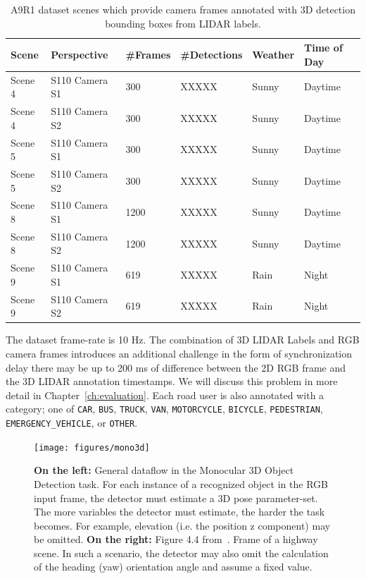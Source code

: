 \begin{table}[h]
    \centering
    \caption{A9R1 dataset scenes which provide camera frames annotated with 3D detection bounding boxes from LIDAR labels.}
    \label{tab:a9r1}
    \begin{tabular}{llllll}
        \toprule
        Scene & Perspective & \#Frames & \#Detections & Weather & Time of Day \\
        \midrule
        Scene 4 & S110 Camera S1 & 300 & XXXXX & Sunny & Daytime \\
        Scene 4 & S110 Camera S2 & 300 & XXXXX & Sunny & Daytime \\
        \midrule
        Scene 5 & S110 Camera S1 & 300 & XXXXX & Sunny & Daytime \\
        Scene 5 & S110 Camera S2 & 300 & XXXXX & Sunny & Daytime \\
        \midrule
        Scene 8 & S110 Camera S1 & 1200 & XXXXX & Sunny & Daytime \\
        Scene 8 & S110 Camera S2 & 1200 & XXXXX & Sunny & Daytime \\
        \midrule
        Scene 9 & S110 Camera S1 & 619 & XXXXX & Rain & Night \\
        Scene 9 & S110 Camera S2 & 619 & XXXXX & Rain & Night \\
        \bottomrule
    \end{tabular}
\end{table}

The dataset frame-rate is 10 Hz. The combination of 3D LIDAR Labels and RGB camera frames introduces an additional challenge in the form of synchronization delay \textemdash there may be up to 200 ms of difference between the 2D RGB frame and the 3D LIDAR annotation timestamps.
We will discuss this problem in more detail in Chapter~\ref{ch:evaluation}.
Each road user is also annotated with a category; one of \texttt{CAR}, \texttt{BUS}, \texttt{TRUCK}, \texttt{VAN}, \texttt{MOTORCYCLE}, \texttt{BICYCLE}, \texttt{PEDESTRIAN}, \texttt{EMERGENCY\_VEHICLE}, or \texttt{OTHER}.


\begin{figure}[htb]
    \texttt{[image: figures/mono3d]}
    \caption{\textbf{On the left:} General dataflow in the Monocular 3D Object Detection task. For each instance of a recognized object in the RGB input frame, the detector must estimate a 3D pose parameter-set. The more variables the detector must estimate, the harder the task becomes. For example, elevation (i.e. the position z component) may be omitted. \textbf{On the right:} Figure 4.4 from~\cite{leonthesis}. Frame of a highway scene. In such a scenario, the detector may also omit the calculation of the heading (yaw) orientation angle and assume a fixed value.}
    \label{fig:mono3d-task-overview}
\end{figure}

